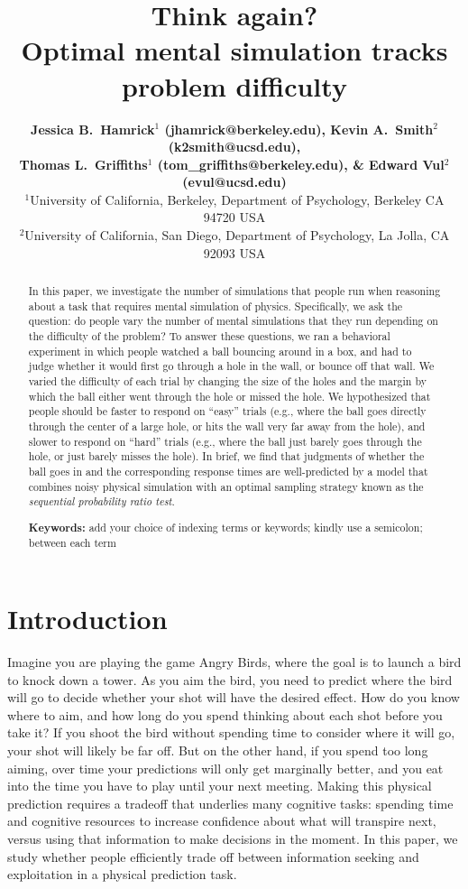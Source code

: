 \documentclass[10pt,letterpaper]{article}
\title{Think again?\\ Optimal mental simulation tracks problem difficulty}
\author{{\large \bf Jessica B.~Hamrick$^1$ (jhamrick@berkeley.edu),
    Kevin A.~Smith$^2$ (k2smith@ucsd.edu),}\\
    {\large \bf Thomas L.~Griffiths$^1$ (tom\_griffiths@berkeley.edu),
      \& Edward Vul$^2$ (evul@ucsd.edu)}\\
    $^1$University of California, Berkeley, Department of Psychology, Berkeley CA 94720 USA\\
    $^2$University of California, San Diego, Department of Psychology, La Jolla, CA 92093 USA}
\begin{document}
\maketitle

\begin{abstract}
In this paper, we investigate the number of simulations that people run when reasoning about a task that requires mental simulation of physics. 
Specifically, we ask the question: do people vary the number of mental simulations that they run depending on the difficulty of the problem?
To answer these questions, we ran a behavioral experiment in which people watched a ball bouncing around in a box, and had to judge whether it would first go through a hole in the wall, or bounce off that wall. 
We varied the difficulty of each trial by changing the size of the holes and the margin by which the ball either went through the hole or missed the hole. 
We hypothesized that people should be faster to respond on ``easy'' trials (e.g., where the ball goes directly through the center of a large hole, or hits the wall very far away from the hole), and slower to respond on ``hard'' trials (e.g., where the ball just barely goes through the hole, or just barely misses the hole). 
In brief, we find that judgments of whether the ball goes in and the corresponding response times are well-predicted by a model that combines noisy physical simulation with an optimal sampling strategy known as the \emph{sequential probability ratio test}.

\textbf{Keywords:} 
add your choice of indexing terms or keywords; kindly use a
semicolon; between each term
\end{abstract}

\section{Introduction}

Imagine you are playing the game Angry Birds, where the goal is to launch a bird to knock down a tower. 
As you aim the bird, you need to predict where the bird will go to decide whether your shot will have the desired effect. 
How do you know where to aim, and how long do you spend thinking about each shot before you take it? 
If you shoot the bird without spending time to consider where it will go, your shot will likely be far off. 
But on the other hand, if you spend too long aiming, over time your predictions will only get marginally better, and you eat into the time you have to play until your next meeting. 
Making this physical prediction requires a tradeoff that underlies many cognitive tasks: spending time and cognitive resources to increase confidence about what will transpire next, versus using that information to make decisions in the moment. 
In this paper, we study whether people efficiently trade off between information seeking and exploitation in a physical prediction task.
\end{document}
